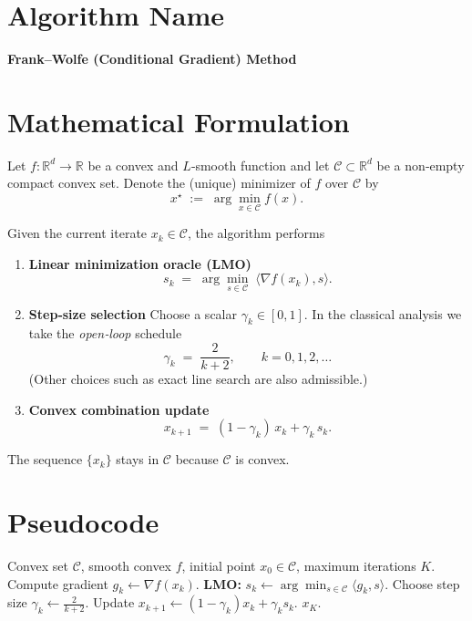 \documentclass{article}
\newcommand{\R}{\mathbb{R}}
\newcommand{\Cset}{\mathcal{C}}
\newcommand{\opt}{x^{\star}}
\newcommand{\grad}{\nabla}
\newcommand{\inner}[2]{\langle #1,#2\rangle}
\begin{document}
\section*{Algorithm Name}
\textbf{Frank–Wolfe (Conditional Gradient) Method}

\section*{Mathematical Formulation}
Let $f:\R^{d}\rightarrow\R$ be a convex and $L$‑smooth function and let $\Cset\subset\R^{d}$ be a non‑empty compact convex set.  
Denote the (unique) minimizer of $f$ over $\Cset$ by
\[
\opt \;:=\; \arg\min_{x\in\Cset} f(x).
\]

Given the current iterate $x_{k}\in\Cset$, the algorithm performs

\begin{enumerate}
\item \textbf{Linear minimization oracle (LMO)}  
\[
s_{k}\;=\;\arg\min_{s\in\Cset}\; \inner{\grad f(x_{k})}{s}.
\tag{1}
\]
\item \textbf{Step‑size selection}  
Choose a scalar $\gamma_{k}\in[0,1]$.  In the classical analysis we take the \emph{open‑loop} schedule
\[
\gamma_{k}\;=\;\frac{2}{k+2},\qquad k=0,1,2,\dots
\tag{2}
\]
(Other choices such as exact line search are also admissible.)
\item \textbf{Convex combination update}  
\[
x_{k+1}\;=\;(1-\gamma_{k})\,x_{k}+\gamma_{k}\,s_{k}.
\tag{3}
\]
\end{enumerate}

The sequence $\{x_{k}\}$ stays in $\Cset$ because $\Cset$ is convex.

\section*{Pseudocode}
\begin{algorithm}[H]
\caption{Frank–Wolfe Method}
\begin{algorithmic}[1]
\Require Convex set $\Cset$, smooth convex $f$, initial point $x_{0}\in\Cset$, maximum iterations $K$.
    \State Compute gradient $g_{k}\gets\grad f(x_{k})$.
    \State \textbf{LMO:} $s_{k}\gets\arg\min_{s\in\Cset}\inner{g_{k}}{s}$.
    \State Choose step size $\displaystyle \gamma_{k}\gets\frac{2}{k+2}$.
    \State Update $x_{k+1}\gets (1-\gamma_{k})x_{k}+\gamma_{k}s_{k}$.
\EndFor
\State \Return $x_{K}$.
\end{algorithmic}
\end{algorithm}
\end{document}
